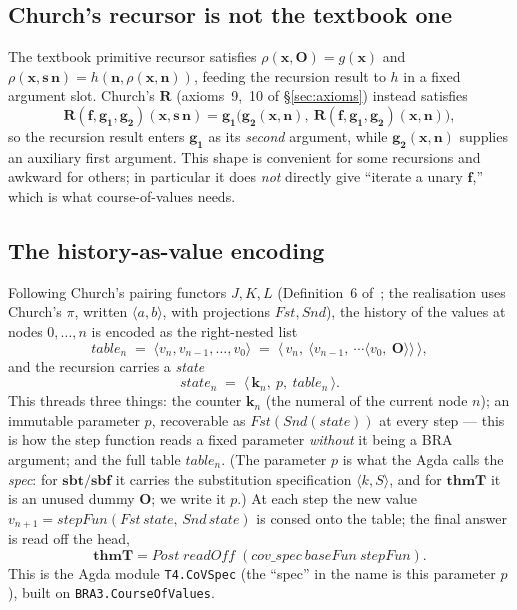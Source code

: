 \documentclass[11pt]{article}
\theoremstyle{plain}
\theoremstyle{definition}
\theoremstyle{remark}
\newcommand{\sbf}{\mathbf{sbf}}
\newcommand{\sbt}{\mathbf{sbt}}
\newcommand{\thmT}{\mathbf{thmT}}
\newcommand{\seq}[1]{\langle #1 \rangle}
\begin{document}
\subsection{Church's recursor is not the textbook one}

The textbook primitive recursor satisfies $\rho(\mathbf{x},\mathbf{O}) =
g(\mathbf{x})$ and $\rho(\mathbf{x},\mathbf{s}\,\mathbf{n}) =
h(\mathbf{n}, \rho(\mathbf{x},\mathbf{n}))$, feeding the recursion result
to $h$ in a fixed argument slot.  Church's $\mathbf{R}$ (axioms~9,~10 of
{\S}\ref{sec:axioms}) instead satisfies
\[
\mathbf{R}(\mathbf{f},\mathbf{g_1},\mathbf{g_2})(\mathbf{x},\mathbf{s}\,\mathbf{n}) = \mathbf{g_1}\bigl(\mathbf{g_2}(\mathbf{x},\mathbf{n}),\ \mathbf{R}(\mathbf{f},\mathbf{g_1},\mathbf{g_2})(\mathbf{x},\mathbf{n})\bigr),
\]
so the recursion result enters $\mathbf{g_1}$ as its \emph{second}
argument, while $\mathbf{g_2}(\mathbf{x},\mathbf{n})$ supplies an
auxiliary first argument.  This shape is convenient for some recursions
and awkward for others; in particular it does \emph{not} directly give
``iterate a unary $\mathbf{f}$,'' which is what course-of-values needs.

\subsection{The history-as-value encoding}

Following Church's pairing functors $J,K,L$ (Definition~6
of~\cite{Guard63}; the realisation uses Church's $\pi$, written
$\seq{a,b}$, with projections $\mathit{Fst},\mathit{Snd}$), the history of
the values at nodes $0,\ldots,n$ is encoded as the right-nested list
\[
\mathit{table}_n \;=\; \seq{v_n, v_{n-1}, \ldots, v_0} \;=\; \seq{\,v_n,\ \seq{v_{n-1},\ \cdots \seq{v_0,\ \mathbf{O}}}\,},
\]
and the recursion carries a \emph{state}
\[
\mathit{state}_n \;=\; \seq{\,\mathbf{k}_n,\ p,\ \mathit{table}_n\,}.
\]
This threads three things: the counter $\mathbf{k}_n$ (the numeral of the
current node $n$); an immutable parameter $p$, recoverable as
$\mathit{Fst}(\mathit{Snd}(\mathit{state}))$ at every step --- this is how
the step function reads a fixed parameter \emph{without} it being a BRA
argument; and the full table $\mathit{table}_n$.  (The parameter $p$ is
what the Agda calls the \emph{spec}: for $\sbt/\sbf$ it carries the
substitution specification $\seq{k,S}$, and for $\thmT$ it is an unused
dummy $\mathbf{O}$; we write it $p$.)  At each step the new value
$v_{n+1} = \mathit{stepFun}(\mathit{Fst}\,\mathit{state},\,
\mathit{Snd}\,\mathit{state})$ is consed onto the table; the final answer
is read off the head,
\[
\thmT = \mathit{Post}\;\mathit{readOff}\;(\mathit{cov\_spec}\ \mathit{baseFun}\ \mathit{stepFun}).
\]
This is the Agda module \verb|T4.CoVSpec| (the ``spec'' in the name is
this parameter $p$), built on \verb|BRA3.CourseOfValues|.
\end{document}
